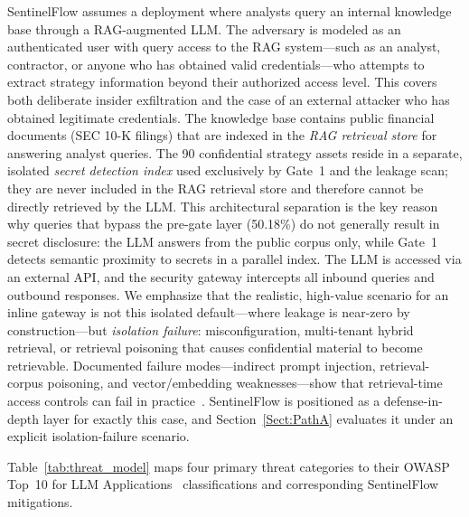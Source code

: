 \documentclass[journal]{IEEEtran}
\begin{document}
SentinelFlow assumes a deployment where analysts query an internal knowledge base through a RAG-augmented LLM. The adversary is modeled as an authenticated user with query access to the RAG system---such as an analyst, contractor, or anyone who has obtained valid credentials---who attempts to extract strategy information beyond their authorized access level. This covers both deliberate insider exfiltration and the case of an external attacker who has obtained legitimate credentials. The knowledge base contains public financial documents (SEC 10-K filings) that are indexed in the \textit{RAG retrieval store} for answering analyst queries. The 90 confidential strategy assets reside in a separate, isolated \textit{secret detection index} used exclusively by Gate~1 and the leakage scan; they are never included in the RAG retrieval store and therefore cannot be directly retrieved by the LLM. This architectural separation is the key reason why queries that bypass the pre-gate layer (50.18\%) do not generally result in secret disclosure: the LLM answers from the public corpus only, while Gate~1 detects semantic proximity to secrets in a parallel index. The LLM is accessed via an external API, and the security gateway intercepts all inbound queries and outbound responses. We emphasize that the realistic, high-value scenario for an inline gateway is not this isolated default---where leakage is near-zero by construction---but \textit{isolation failure}: misconfiguration, multi-tenant hybrid retrieval, or retrieval poisoning that causes confidential material to become retrievable. Documented failure modes---indirect prompt injection, retrieval-corpus poisoning, and vector/embedding weaknesses---show that retrieval-time access controls can fail in practice~\cite{owasp_llm_2025}. SentinelFlow is positioned as a defense-in-depth layer for exactly this case, and Section~\ref{Sect:PathA} evaluates it under an explicit isolation-failure scenario.

Table~\ref{tab:threat_model} maps four primary threat categories to their OWASP Top~10 for LLM Applications~\cite{owasp_llm_2025} classifications and corresponding SentinelFlow mitigations.
\end{document}
